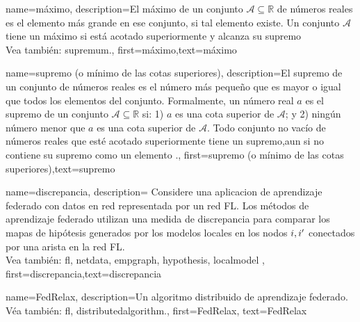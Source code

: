 {name=máximo,
     description={El máximo de un conjunto $\mathcal{A} \subseteq \mathbb{R}$ 
	 de números reales es el elemento más grande en ese conjunto, si tal elemento existe. Un conjunto $\mathcal{A}$ 
	 tiene un máximo si está acotado superiormente y alcanza su supremo \cite[Sec.~1.4]{RudinBookPrinciplesMatheAnalysis}
	 \\
		Vea también: \gls{supremum}.},
 first={máximo},text={máximo}
}

{name=supremo (o mínimo de las cotas superiores),
	description={El supremo de un conjunto de números reales es 
		el número más pequeño que es mayor o igual que todos los elementos del conjunto. Formalmente, un número real 
		$a$ es el supremo de un conjunto $\mathcal{A} \subseteq \mathbb{R}$ si: 1) $a$ 
		es una cota superior de $\mathcal{A}$; y 2) ningún número menor que $a$ es una cota superior de $\mathcal{A}$. 
		Todo conjunto no vacío de números reales que esté acotado superiormente tiene un supremo,aun si no contiene su supremo como un elemento \cite[Sec.~1.4]{RudinBookPrinciplesMatheAnalysis}.},
	first={supremo (o mínimo de las cotas superiores)},text={supremo}
}

{name=discrepancia,
	description={
		Considere una aplicacion de aprendizaje federado con datos en red 
		representada por un red FL. Los métodos de aprendizaje federado utilizan una medida de discrepancia para  
		comparar los mapas de hipótesis generados por los modelos locales en los nodos $i,i'$ 
		conectados por una arista en la red FL.
		\\
			Vea también: \gls{fl}, \gls{netdata}, \gls{empgraph}, \gls{hypothesis}, \gls{localmodel} },
	first={discrepancia},text={discrepancia}
}

{name={FedRelax},
	description={Un algoritmo distribuido de aprendizaje federado.\\ 
		Véa también: \gls{fl}, \gls{distributedalgorithm}.},
	first={FedRelax},
	text={FedRelax}
} 


